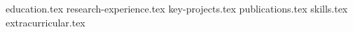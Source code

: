 \documentclass[11pt, a4paper]{awesome-cv}
\newcommand*{\sectiondir}{resume/}
\begin{document}
\makecvheader

{education.tex}
{research-experience.tex}
{key-projects.tex}
{publications.tex}
{skills.tex}
{extracurricular.tex}
\end{document}
